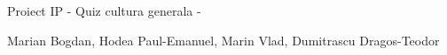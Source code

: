 Proiect IP -\/ Quiz cultura generala -\/

Marian Bogdan, Hodea Paul-\/\+Emanuel, Marin Vlad, Dumitrascu Dragos-\/\+Teodor 